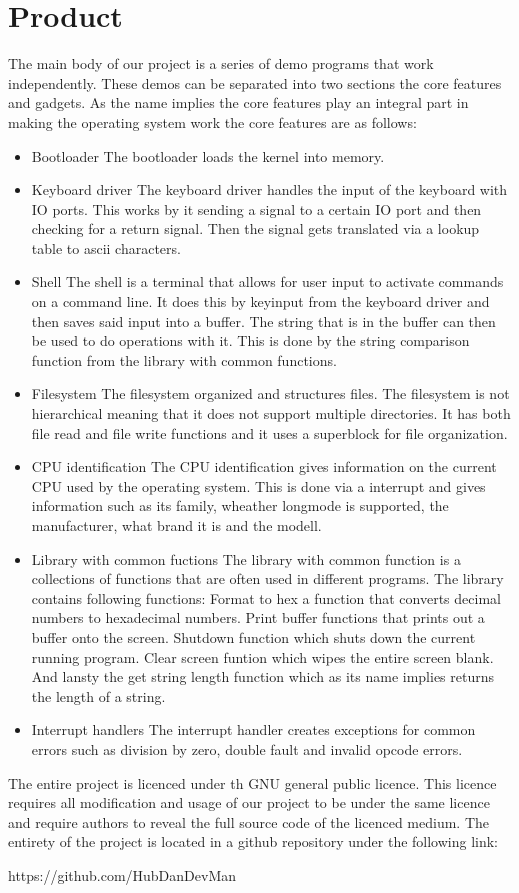 \section{Product}

The main body of our project is a series of demo programs that work independently.
These demos can be separated into two sections the core features and gadgets.
As the name implies the core features play an integral part in making the operating
system work the core features are as follows:


\begin{itemize}

\item Bootloader
The bootloader loads the kernel into memory.
\item Keyboard driver
The keyboard driver handles the input of the keyboard with IO ports. This works
by it sending a signal to a certain IO port and then checking for a return signal.
Then the signal gets translated via a lookup table to ascii characters.
\item Shell
The shell is a terminal that allows for user input to activate commands on a command
line. It does this by keyinput from the keyboard driver and then saves said input
into a buffer. The string that is in the buffer can then be used to do operations with
it. This is done by the string comparison function from the library with common functions.
\item Filesystem
The filesystem organized and structures files. The filesystem is not hierarchical meaning
that it does not support multiple directories. It has both file read and file write functions
and it uses a superblock for file organization.
\item CPU identification
The CPU identification gives information on the current CPU used by the operating system.
This is done via a interrupt and gives information such as its family, wheather longmode is
supported, the manufacturer, what brand it is and the modell.
\item Library with common fuctions
The library with common function is a collections of functions that are often used in different
programs. The library contains following functions: Format to hex a function that converts decimal
numbers to hexadecimal numbers. Print buffer functions that prints out a buffer onto the screen. 
Shutdown function which shuts down the current running program. Clear screen funtion which wipes
the entire screen blank. And lansty the get string length function which as its name implies returns
the length of a string.
\item Interrupt handlers
The interrupt handler creates exceptions for common errors such as division by zero, double fault
and invalid opcode errors.


\end{itemize}


The entire project is licenced under th GNU general public licence. This licence requires all
modification and usage of our project to be under the same licence and require authors to reveal
the full source code of the licenced medium. The entirety of the project is located in a github
repository under the following link:

https://github.com/HubDanDevMan
